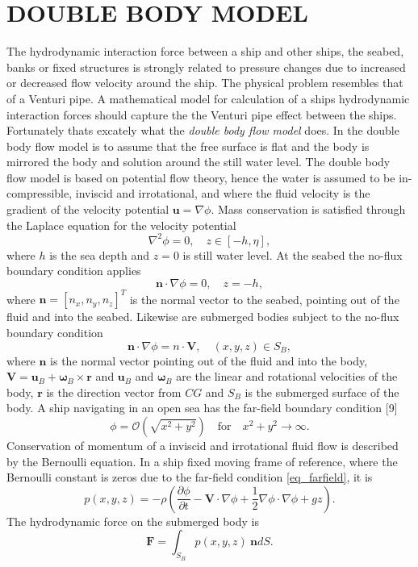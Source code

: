 \documentclass[A4paper,11pt]{marine_2023_Paper}
\newcommand{\V}[1]{\boldsymbol{#1}}
\newcommand{\D}[2]{\frac{\partial #1}{\partial #2}}
\begin{document}
\section{DOUBLE BODY MODEL}
The hydrodynamic interaction force between a ship and other ships, the seabed, banks or fixed structures is strongly related to pressure changes due to increased or decreased flow velocity around the ship. The physical problem resembles that of a Venturi pipe. A mathematical model for calculation of a ships hydrodynamic interaction forces should capture the the Venturi pipe effect between the ships. Fortunately thats excately what the \emph{double body flow model} does. In the double body flow model is to assume that the free surface is flat and the body is mirrored the body and solution around
the still water level.
The double body flow model is based on potential flow theory, hence the water is assumed to be in-
compressible, inviscid and irrotational, and where the fluid velocity is the gradient of the velocity potential $\V{u} = \nabla \phi$. 
Mass conservation is satisfied through the Laplace equation for the velocity potential
\begin{equation}
	\nabla^2 \phi = 0, \quad z \in [-h,\eta],
\end{equation}
where $h$ is the sea depth and $z = 0$ is still water level. At the seabed the no-flux boundary condition applies
\begin{equation}
	\V{n} \cdot \nabla \phi = 0, \quad z = -h, 
\end{equation}
where $\V{n} = [n_x, n_y, n_z]^T$ is the normal vector to the seabed, pointing out of the fluid and into the seabed. Likewise are submerged bodies subject to the no-flux boundary condition
\begin{equation}
	\V{n} \cdot \nabla \phi = n \cdot \V{V} , \quad (x, y, z) \in S_B, 
\end{equation}
where $\V{n}$ is the normal vector pointing out of the fluid and into the body, $\V{V} =\V{u}_B + \V{\omega}_B \times \V{r}$ and $\V{u}_B$ and $\V{\omega}_B$ are the linear and rotational velocities of the body, $\V{r}$ is the direction vector from $CG$ and $S_B$ is the submerged surface of the body. A ship navigating in an open sea has the far-field boundary condition [9]
\begin{equation}
	\phi = \mathcal{O} (\sqrt{x^2 + y^2}) \quad \mathrm{for} \quad x^2 + y^2 \rightarrow \infty. 
	\label{eq_farfield}
\end{equation}
Conservation of momentum of a inviscid and irrotational fluid flow is described by the Bernoulli equation. In a ship fixed moving frame of reference, where the Bernoulli constant is zeros due to the far-field condition \eqref{eq_farfield}, it is
\begin{equation}
	p(x, y, z) = -\rho \left(\D{\phi}{t} -\V{V} \cdot \nabla \phi + \frac{1}{2} \nabla \phi \cdot \nabla \phi + gz \right).
	\label{eq_bernoulli}
\end{equation}
The hydrodynamic force on the submerged body is
\begin{equation}
	\V{F} = \int_{S_B} p(x, y, z) ~\V{n} dS.
	\label{eq_hydrodynamic_pressure_force} 
\end{equation}
\end{document}
